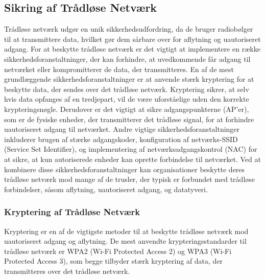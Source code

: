 \subsection{Sikring af Trådløse Netværk}
Trådløse netværk udgør en unik sikkerhedsudfordring, da de bruger radiobølger til at transmittere data, hvilket gør dem sårbare over for aflytning og uautoriseret adgang. For at beskytte trådløse netværk er det vigtigt at implementere en række sikkerhedsforanstaltninger, der kan forhindre, at uvedkommende får adgang til netværket eller kompromitterer de data, der transmitteres.
\newline\newline\noindent
En af de mest grundlæggende sikkerhedsforanstaltninger er at anvende stærk kryptering for at beskytte data, der sendes over det trådløse netværk. Kryptering sikrer, at selv hvis data opfanges af en tredjepart, vil de være uforståelige uden den korrekte krypteringsnøgle. Derudover er det vigtigt at sikre adgangspunkterne (AP'er), som er de fysiske enheder, der transmitterer det trådløse signal, for at forhindre uautoriseret adgang til netværket.
\newline\newline\noindent
Andre vigtige sikkerhedsforanstaltninger inkluderer brugen af stærke adgangskoder, konfiguration af netværks-SSID (Service Set Identifier), og implementering af netværksadgangskontrol (NAC) for at sikre, at kun autoriserede enheder kan oprette forbindelse til netværket.
\newline\newline\noindent
Ved at kombinere disse sikkerhedsforanstaltninger kan organisationer beskytte deres trådløse netværk mod mange af de trusler, der typisk er forbundet med trådløse forbindelser, såsom aflytning, uautoriseret adgang, og datatyveri.

\subsubsection{Kryptering af Trådløse Netværk}
Kryptering er en af de vigtigste metoder til at beskytte trådløse netværk mod uautoriseret adgang og aflytning. De mest anvendte krypteringsstandarder til trådløse netværk er WPA2 (Wi-Fi Protected Access 2) og WPA3 (Wi-Fi Protected Access 3), som begge tilbyder stærk kryptering af data, der transmitteres over det trådløse netværk.

